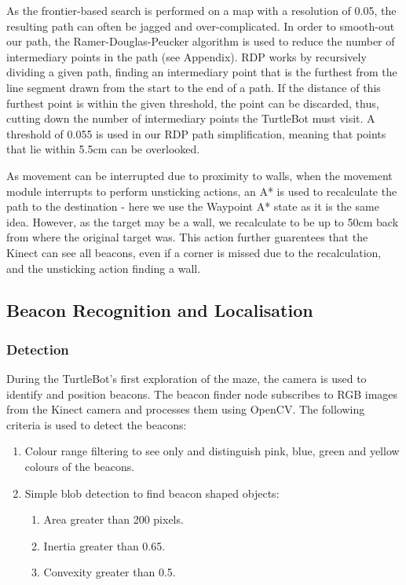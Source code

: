 \documentclass[titlepage,12pt,a4paper]{article}
\begin{document}
As the frontier-based search is performed on a map with a resolution of 0.05, the resulting path can often be jagged and over-complicated. In order to smooth-out our path, the Ramer-Douglas-Peucker algorithm is used to reduce the number of intermediary points in the path (see Appendix). RDP works by recursively dividing a given path, finding an intermediary point that is the furthest from the line segment drawn from the start to the end of a path. If the distance of this furthest point is within the given threshold, the point can be discarded, thus, cutting down the number of intermediary points the TurtleBot must visit. A threshold of 0.055 is used in our RDP path simplification, meaning that points that lie within 5.5cm can be overlooked.

As movement can be interrupted due to proximity to walls, when the movement module interrupts to perform unsticking actions, an A* is used to recalculate the path to the destination - here we use the Waypoint A* state as it is the same idea. However, as the target may be a wall, we recalculate to be up to 50cm back from where the original target was. This action further guarentees that the Kinect can see all beacons, even if a corner is missed due to the recalculation, and the unsticking action finding a wall.

\pagebreak
\subsection{Beacon Recognition and Localisation}

\subsubsection{Detection}
During the TurtleBot's first exploration of the maze, the camera is used to identify and position beacons. The beacon finder node subscribes to RGB images from the Kinect camera and processes them using OpenCV. The following criteria is used to detect the beacons:

    \begin{enumerate}
        \item Colour range filtering to see only and distinguish pink, blue, green and yellow colours of the beacons.
        \item Simple blob detection to find beacon shaped objects:
        \begin{enumerate}
            \item Area greater than 200 pixels.
            \item Inertia greater than 0.65.
            \item Convexity greater than 0.5.
        \end{enumerate}
    \end{enumerate}
\end{document}

